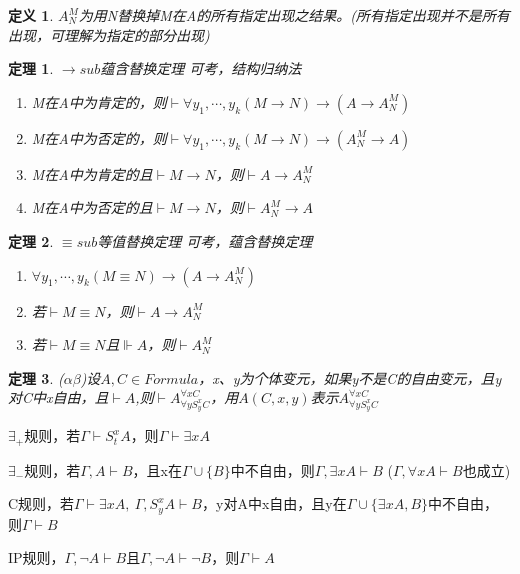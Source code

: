 \documentclass[a4paper]{ctexart}
\newtheorem{thm}{\hspace{2em}定理}[subsection]
\newtheorem{defi}{\hspace{2em}定义}[subsection]
\newcommand{\shade}[1]{\colorbox{shadecolor}{#1}}
\begin{document}
\begin{defi}
  $A_N^M$为用N替换掉M在A的所有指定出现之结果。(所有指定出现并不是所有出现，可理解为指定的部分出现)
\end{defi}

\begin{thm}
  $\rightarrow sub$蕴含替换定理 \shade{可考，结构归纳法}
  \begin{enumerate}[itemindent=2em]
    \item M在A中为肯定的，则$\vdash\forall{y_1,\cdots,y_k}(M\rightarrow N)\rightarrow(A\rightarrow A_N^M)$
    \item M在A中为否定的，则$\vdash\forall{y_1,\cdots,y_k}(M\rightarrow N)\rightarrow(A_N^M\rightarrow A)$
    \item M在A中为肯定的且$\vdash M\rightarrow N$，则$\vdash A\rightarrow A_N^M$
    \item M在A中为否定的且$\vdash M\rightarrow N$，则$\vdash A_N^M\rightarrow A$
  \end{enumerate}
\end{thm}

\begin{thm}
  $\equiv sub$等值替换定理 \shade{可考，蕴含替换定理}
  \begin{enumerate}
    \item $\forall{y_1,\cdots,y_k}(M\equiv N)\rightarrow(A\rightarrow A_N^M)$
    \item 若$\vdash M\equiv N$，则$\vdash A\rightarrow A_N^M$
    \item 若$\vdash M\equiv N$且$\Vdash A$，则$\vdash A_N^M$
  \end{enumerate}
\end{thm}

\begin{thm}
  ($\alpha\beta$)设$A,C\in Formula$，x、y为个体变元，如果y不是C的自由变元，且y对C中x自由，且$\vdash A$,则$\vdash A^{\forall{x}C}_{\forall{y}S_y^xC}$，用$A(C,x,y)$表示$A^{\forall{x}C}_{\forall{y}S_y^xC}$
\end{thm}

$\exists_+$规则，若$\Gamma\vdash S^x_tA$，则$\Gamma\vdash \exists{x}A$

\indent$\exists_-$规则，若$\Gamma,A\vdash B$，且x在$\Gamma\cup\{B\}$中不自由，则$\Gamma,\exists{x}A\vdash B$ ($\Gamma,\forall{x}A\vdash B$也成立)

C规则，若$\Gamma\vdash\exists{x}A,\ \Gamma,S^x_yA\vdash B$，y对A中x自由，且y在$\Gamma\cup\{\exists{x}A,B\}$中不自由，则$\Gamma\vdash B$

IP规则，$\Gamma,\neg A\vdash B$且$\Gamma,\neg A\vdash\neg B$，则$\Gamma\vdash A$
\end{document}
